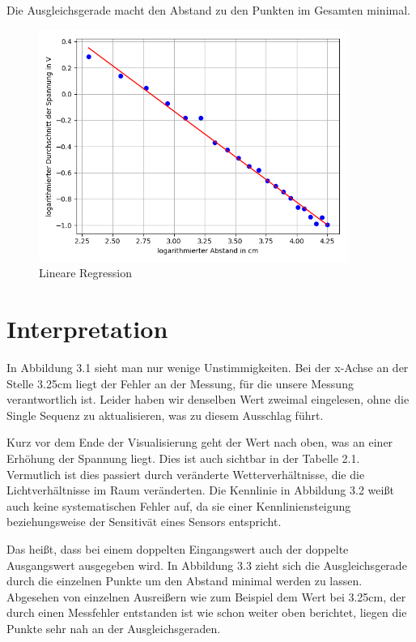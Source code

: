 \documentclass[12pt, oneside, a4paper, \docLanguage]{report}
\begin{document}
\newline
Die Ausgleichsgerade macht den Abstand zu den Punkten im Gesamten minimal.
\begin{figure}[hbt!]
	\centering\small
	\includegraphics[width=0.9\textwidth]{media/myplot3.png}
	\caption{Lineare Regression}
	\label{fig:Lineare Regression}
\end{figure}
\newpage
\section{Interpretation}
\label{chap:VERSUCH_2_INTERPRETATION}
In Abbildung 3.1 sieht man nur wenige Unstimmigkeiten.
Bei der x-Achse an der Stelle 3.25cm liegt der Fehler an der Messung, für die unsere Messung verantwortlich ist.
Leider haben wir denselben Wert zweimal eingelesen, ohne die Single Sequenz zu aktualisieren, was zu diesem Ausschlag führt.

Kurz vor dem Ende der Visualisierung geht der Wert nach oben, was an einer Erhöhung der Spannung liegt. Dies ist auch sichtbar in der Tabelle 2.1.
Vermutlich ist dies passiert durch veränderte Wetterverhältnisse, die die Lichtverhältnisse im Raum veränderten.
\newline
\newline
Die Kennlinie in Abbildung 3.2 weißt auch keine systematischen Fehler auf, da sie einer Kennliniensteigung beziehungsweise der Sensitivät eines Sensors entspricht.

Das heißt, dass bei einem doppelten Eingangswert auch der doppelte Ausgangswert ausgegeben wird.
\newline
\newline
In Abbildung 3.3 zieht sich die Ausgleichsgerade durch die einzelnen Punkte um den Abstand minimal werden zu lassen. Abgesehen von einzelnen Ausreißern wie zum Beispiel dem Wert bei 3.25cm, der durch einen Messfehler entstanden ist wie schon weiter oben berichtet, liegen die Punkte sehr nah an der Ausgleichsgeraden.
\end{document}
